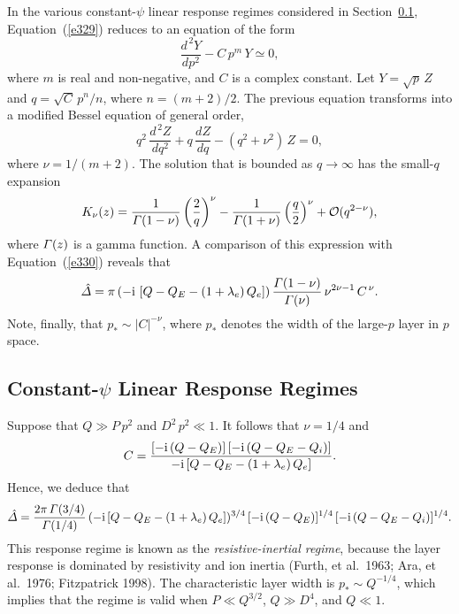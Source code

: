 \documentclass[notitlepage,12pt]{article}
\begin{document}
In the various constant-$\psi$ linear response regimes considered in Section~\ref{scp}, Equation~(\ref{e329}) reduces to an
equation of the form
\begin{equation}\label{e330a}
\frac{d^{\,2}Y}{dp^2}- C\,p^m\,Y\simeq 0,
\end{equation}
where $m$ is real and non-negative, and $C$ is a complex constant. Let $Y=\sqrt{p}\,Z$ and $q=\sqrt{C}\,p^n/n$, where
$n=(m+2)/2$. The previous equation transforms into a modified Bessel equation of general order, 
\begin{equation}
q^2\,\frac{d^{\,2}Z}{dq^2} + q\,\frac{dZ}{dq} - (q^2+\nu^2)\,Z =0,
\end{equation}
where $\nu=1/(m+2)$. The solution that is bounded as $q\rightarrow \infty$ has the small-$q$
expansion
\begin{equation}\label{e332}
K_\nu(z)= \frac{1}{{\mit\Gamma}(1-\nu)}\left(\frac{2}{q}\right)^\nu - \frac{1}{{\mit\Gamma}(1+\nu)}\left(\frac{q}{2}\right)^\nu + {\cal O}(q^{2-\nu}),
\end{equation}
where ${\mit\Gamma}(z)$ is a gamma function. 
A comparison of this expression with Equation~(\ref{e330}) reveals that
\begin{equation}
\hat{\mit\Delta} = \pi\,(-{\rm i}\,\left[Q-Q_E-(1+\lambda_e)\,Q_e\right])\, \frac{{\mit\Gamma}(1-\nu)}{{\mit\Gamma}(\nu)}\,\nu^{2\nu-1}\,C^{\,\nu}.
\end{equation}
Note, finally, that $p_\ast\sim |C|^{-\nu}$, where $p_\ast$ denotes the width of the large-$p$ layer in $p$ space.

\subsection{Constant-$\psi$ Linear Response Regimes}\label{scp}
Suppose that $Q\gg P\,p^2$ and $D^2\,p^2 \ll 1$. It follows that $\nu=1/4$ and
\begin{equation}
C = \frac{[-{\rm i}\,(Q-Q_E)]\,[-{\rm i}\,(Q-Q_E-Q_i)]}{-{\rm i}\,[Q-Q_E-(1+\lambda_e)\,Q_e]}.
\end{equation}
Hence, we deduce that
\begin{equation}\label{ri}
\hat{\mit\Delta} = \frac{2\pi\,{\mit\Gamma}(3/4)}{{\mit\Gamma}(1/4)}\,(-{\rm i}\,[Q-Q_E-(1+\lambda_e)\,Q_e])^{3/4}\,[-{\rm i}\,(Q-Q_E)]^{1/4}\,[-{\rm i}\,(Q-Q_E-Q_i)]^{1/4}.
\end{equation}
This response regime is known as the {\em resistive-inertial regime}, because the layer response is dominated by
resistivity and ion inertia (Furth, et al.\ 1963; Ara, et al.\ 1976; Fitzpatrick 1998). The characteristic layer width is $p_\ast \sim Q^{-1/4}$,
which implies that the regime is valid when $P\ll Q^{3/2}$, $Q\gg D^4$, and $Q\ll 1$. 
\end{document}

